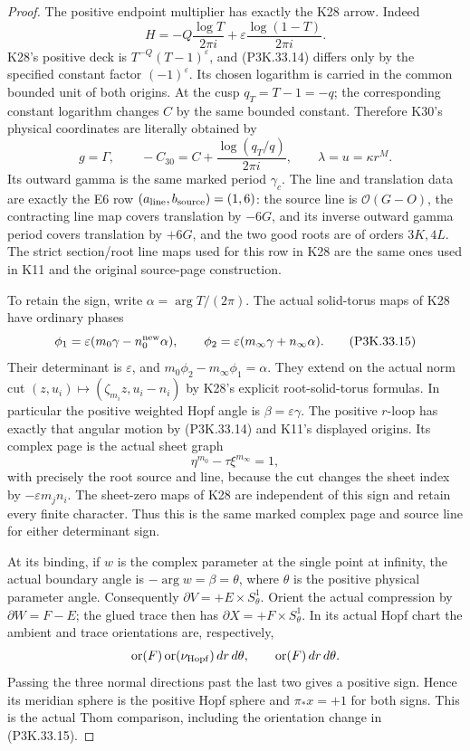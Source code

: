 \begin{proof}
The positive endpoint multiplier has exactly the K28 arrow. Indeed
\[
 H=-Q\frac{\log T}{2\pi i}
       +\varepsilon\frac{\log(1-T)}{2\pi i}.
                                                               \tag{P3K.33.14}
\]
K28's positive deck is
\(T^{-Q}(T-1)^{\varepsilon}\), and (P3K.33.14) differs only by
the specified constant factor \((-1)^{\varepsilon}\). Its chosen
logarithm is carried in the common bounded unit of both origins.
At the cusp \(q_T=T-1=-q\); the corresponding constant logarithm
changes \(C\) by the same bounded constant. Therefore K30's
physical coordinates are literally obtained by
\[
 g=\Gamma,\qquad -C_{30}=C+\frac{\log(q_T/q)}{2\pi i},
 \qquad \lambda=u=\kappa r^M.
\]
Its outward gamma is the same marked period \(\gamma_c\).
The line and translation data are exactly the E6 row
\((a_{\rm line},b_{\rm source})=(1,6)\): the source line is
\(\mathcal O(G-O)\), the contracting line map covers
translation by \(-6G\), and its inverse outward gamma period
covers translation by \(+6G\),
and the two good roots are of orders \(3K,4L\). The strict
section/root line maps used for this row in K28 are the same
ones used in K11 and the original source-page construction.

To retain the sign, write \(\alpha=\arg T/(2\pi)\). The actual
solid-torus maps of K28 have ordinary phases
\[
 \phi_1=\varepsilon(m_0\gamma-n_0^{\rm new}\alpha),\qquad
 \phi_2=\varepsilon(m_\infty\gamma+n_\infty\alpha).
                                                               \tag{P3K.33.15}
\]
Their determinant is \(\varepsilon\), and
\(m_0\phi_2-m_\infty\phi_1=\alpha\). They extend on the
actual norm cut \((z,u_i)\mapsto(\zeta_{m_i}z,u_i-n_i)\)
by K28's explicit root-solid-torus formulas. In particular the
positive weighted Hopf angle is \(\beta=\varepsilon\gamma\).
The positive \(r\)-loop has exactly that angular motion by
(P3K.33.14) and K11's displayed origins. Its complex page is the
actual sheet graph
\[
                 \eta^{m_0}-\tau\xi^{m_\infty}=1,
\]
with precisely the root source and line, because the cut changes
the sheet index by \(-\varepsilon m_jn_i\). The sheet-zero
maps of K28 are independent of this sign and retain every
finite character. Thus this is the same marked complex page
and source line for either determinant sign.

At its binding, if \(w\) is the complex parameter at the single
point at infinity, the actual boundary angle is
\(-\arg w=\beta=\theta\), where \(\theta\) is the positive
physical parameter angle. Consequently
\(\partial V=+E\times S^1_\theta\). Orient the actual compression
by \(\partial W=F-E\); the glued trace then has
\(\partial X=+F\times S^1_\theta\). In its actual Hopf chart
the ambient and trace orientations are, respectively,
\[
 \operatorname{or}(F)\operatorname{or}(\nu_{\rm Hopf})\,dr\,d\theta,
 \qquad \operatorname{or}(F)\,dr\,d\theta.
\]
Passing the three normal directions past the last two gives a
positive sign. Hence its meridian sphere is the positive Hopf
sphere and \(\pi_*x=+1\) for both signs. This is the actual
Thom comparison, including the orientation change in (P3K.33.15).


\end{proof}
